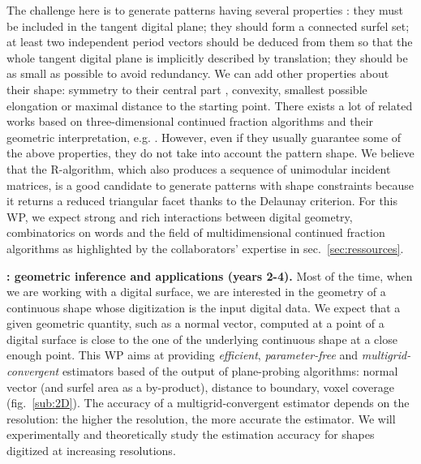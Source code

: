 The challenge here is to generate patterns having several properties \cite{Jamet2016}: 
they must be included in the tangent digital plane;
they should form a connected surfel set;
at least two independent period vectors should be deduced from them so that the whole tangent digital plane is implicitly described by translation;
they should be as small as possible to avoid redundancy.
We can add other properties about their shape: 
symmetry to their central part \cite{Labbe2015}, convexity, smallest possible elongation 
or maximal distance to the starting point. 
There exists a lot of related works based on three-dimensional continued fraction algorithms and their geometric interpretation, e.g. \cite{Fernique2009,Labbe2011,Jamet2016}. However, even if they usually guarantee some of the above properties, they do not take into account the pattern shape. We believe that the R-algorithm, which also produces a sequence of unimodular incident matrices, is a good candidate to generate patterns with shape constraints because it returns a reduced triangular facet thanks to the Delaunay criterion. For this WP, we expect strong and rich interactions between digital geometry, combinatorics on words and the field of multidimensional continued fraction algorithms as highlighted by the collaborators' expertise in sec.~\ref{sec:ressources}.


\noindent\textbf{\wpEstim: geometric inference and applications (years 2-4).} Most of the time, when we are working with a digital surface, we are 
interested in the geometry of a continuous shape whose digitization is the input digital data.
We expect that a given geometric quantity, such as a normal vector, computed at a point of a digital surface is close to the one of the underlying continuous shape at a close enough point. 
This WP aims at providing \emph{efficient}, \emph{parameter-free} and \emph{multigrid-convergent} estimators based of the output of plane-probing algorithms: normal vector (and surfel area as a by-product), distance to boundary, voxel coverage (fig.~\ref{sub:2D}). The accuracy of a multigrid-convergent estimator depends on the resolution: the higher the resolution, the more accurate the estimator. We will experimentally and theoretically study the estimation accuracy for shapes digitized at increasing resolutions. 

